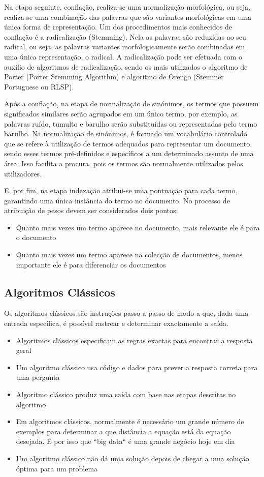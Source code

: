 \documentclass[a4paper,10pt]{article}
\begin{document}
Na etapa seguinte, conflação, realiza-se uma normalização morfológica, ou seja, realiza-se uma combinação das palavras que são variantes morfológicas em uma única forma de representação.
Um dos procedimentos mais conhecidos de conflação é a radicalização (Stemming).
Nela as palavras são reduzidas ao seu radical, ou seja, as palavras variantes morfologicamente serão combinadas em uma única representação, o radical.
A radicalização pode ser efetuada com o auxílio de algoritmos de radicalização, sendo os mais utilizados o algoritmo de Porter (Porter Stemming Algorithm) e algoritmo de Orengo (Stemmer Portuguese ou RLSP).

Após a conflação, na etapa de normalização de sinónimos, os termos que possuem significados similares serão agrupados em um único termo, por exemplo, as palavras ruído, tumulto e barulho serão substituídas ou representadas pelo termo barulho.
Na normalização de sinónimos, é formado um vocabulário controlado que se refere à utilização de termos adequados para representar um documento, sendo esses termos pré-definidos e específicos a um determinado assunto de uma área.
Isso facilita a procura, pois os termos são normalmente utilizados pelos utilizadores.

E, por fim, na etapa indexação atribui-se uma pontuação para cada termo, garantindo uma única instância do termo no documento.
No processo de atribuição de pesos devem ser considerados dois pontos:
\begin{itemize}
    \item Quanto mais vezes um termo aparece no documento, mais relevante ele é para o documento
    \item Quanto mais vezes um termo aparece na colecção de documentos, menos importante ele é para diferenciar os documentos
\end{itemize}

\subsection{Algoritmos Clássicos}

Os algoritmos clássicos são instruções passo a passo de modo a que, dada uma entrada específica, é possível rastrear e determinar exactamente a saída.
\begin{itemize}
    \item Algoritmos clássicos especificam as regras exactas para encontrar a resposta geral
    \item Um algoritmo clássico usa código e dados para prever a resposta correta para uma pergunta
    \item Algoritmo clássico produz uma saída com base nas etapas descritas no algoritmo
    \item Em algoritmos clássicos, normalmente é necessário um grande número de exemplos para determinar a que distância a equação está da equação desejada. É por isso que ``big data`` é uma grande negócio hoje em dia
    \item Um algoritmo clássico não dá uma solução depois de chegar a uma solução óptima para um problema
\end{itemize}
\end{document}
